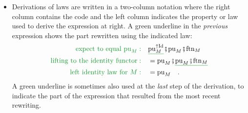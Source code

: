 \begin{itemize}
\item Derivations of laws are written in a two-column notation where the
right column contains the code and the left column indicates the property
or law used to derive the expression at right. A green underline in
the \emph{previous} expression shows the part rewritten using the
indicated law:
\begin{align*}
{\color{greenunder}\text{expect to equal }\text{pu}_{M}:}\quad & \gunderline{\text{pu}_{M}^{\uparrow\text{Id}}}\bef\text{pu}_{M}\bef\text{ftn}_{M}\\
{\color{greenunder}\text{lifting to the identity functor}:}\quad & =\text{pu}_{M}\bef\gunderline{\text{pu}_{M}\bef\text{ftn}_{M}}\\
{\color{greenunder}\text{left identity law for }M:}\quad & =\text{pu}_{M}\quad.
\end{align*}
A green underline is sometimes also used at the \emph{last} step of
the derivation, to indicate the part of the expression that resulted
from the most recent rewriting.
\end{itemize}

